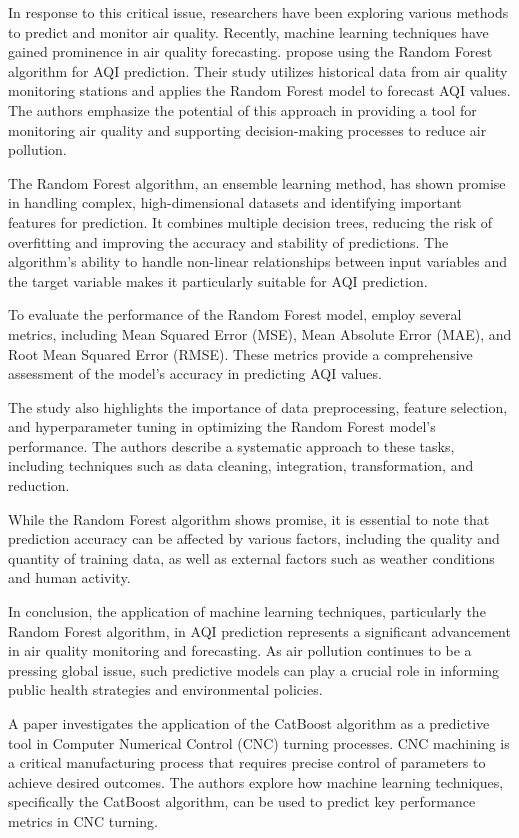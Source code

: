 \documentclass{book}
\numberwithin{equation}{section}
\numberwithin{figure}{section}
\begin{document}
In response to this critical issue, researchers have been exploring various methods to predict and monitor air quality. Recently, machine learning techniques have gained prominence in air quality forecasting. propose using the Random Forest algorithm for AQI prediction. Their study utilizes historical data from air quality monitoring stations and applies the Random Forest model to forecast AQI values. The authors emphasize the potential of this approach in providing a tool for monitoring air quality and supporting decision-making processes to reduce air pollution.

The Random Forest algorithm, an ensemble learning method, has shown promise in handling complex, high-dimensional datasets and identifying important features for prediction. It combines multiple decision trees, reducing the risk of overfitting and improving the accuracy and stability of predictions. The algorithm's ability to handle non-linear relationships between input variables and the target variable makes it particularly suitable for AQI prediction.

To evaluate the performance of the Random Forest model, employ several metrics, including Mean Squared Error (MSE), Mean Absolute Error (MAE), and Root Mean Squared Error (RMSE). These metrics provide a comprehensive assessment of the model's accuracy in predicting AQI values.

The study also highlights the importance of data preprocessing, feature selection, and hyperparameter tuning in optimizing the Random Forest model's performance. The authors describe a systematic approach to these tasks, including techniques such as data cleaning, integration, transformation, and reduction.

While the Random Forest algorithm shows promise, it is essential to note that prediction accuracy can be affected by various factors, including the quality and quantity of training data, as well as external factors such as weather conditions and human activity.

In conclusion, the application of machine learning techniques, particularly the Random Forest algorithm, in AQI prediction represents a significant advancement in air quality monitoring and forecasting. As air pollution continues to be a pressing global issue, such predictive models can play a crucial role in informing public health strategies and environmental policies.

A paper investigates the application of the CatBoost algorithm as a predictive tool in Computer Numerical Control (CNC) turning processes. CNC machining is a critical manufacturing process that requires precise control of parameters to achieve desired outcomes. The authors explore how machine learning techniques, specifically the CatBoost algorithm, can be used to predict key performance metrics in CNC turning.
\end{document}
